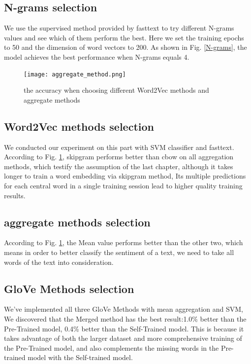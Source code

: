 \documentclass[journal]{IEEEtran}
\begin{document}
\subsection{N-grams selection} 
We use the supervised method provided by fasttext to try different N-grams values and see which of them perform the best. Here we set the training epochs to 50 and the dimension of word vectors to 200. As shown in Fig. \ref{N-grams}, the model achieves the best performance when N-grams equals 4.

\begin{figure}[h]
    \centering
        \texttt{[image: aggregate\_method.png]}
    \caption{\label{aggregate}the accuracy when choosing different Word2Vec methods and aggregate methods}
\end{figure}

\subsection{Word2Vec methods selection}
We conducted our experiment on this part with SVM classifier and fasttext. According to Fig. \ref{aggregate}, skipgram performs better than cbow on all aggregation methods, which testify the assumption of the last chapter, although it takes longer to train a word embedding via skipgram method, Its multiple predictions for each central word in a single training session lead to higher quality training results.

\subsection{aggregate methods selection}
According to Fig. \ref{aggregate}, the Mean value performs better than the other two, which means in order to better classify the sentiment of a text, we need to take all words of the text into consideration.

\subsection{GloVe Methods selection}
We've implemented all three GloVe Methods with mean aggregation and SVM, 
We discovered that the Merged method has the best result:1.0\% better than the Pre-Trained model, 0.4\% better than the Self-Trained model. This is because it takes advantage of both the larger dataset and more comprehensive training of the Pre-Trained model, and also complements the missing words in the Pre-trained model with the Self-trained model. 
\end{document}
